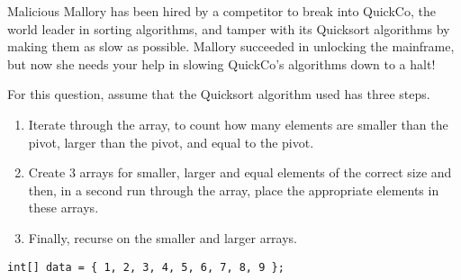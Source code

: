 \begin{blocksection}
Malicious Mallory has been hired by a competitor to break into QuickCo, the
world leader in sorting algorithms, and tamper with its Quicksort algorithms by
making them as slow as possible. Mallory succeeded in unlocking the mainframe,
but now she needs your help in slowing QuickCo's algorithms down to a halt!

For this question, assume that the Quicksort algorithm used has three steps.

\begin{enumerate}
\item Iterate through the array, to count how many elements are smaller than
the pivot, larger than the pivot, and equal to the pivot.
\item Create 3 arrays for smaller, larger and equal elements of the correct
size and then, in a second run through the array, place the appropriate
elements in these arrays.
\item Finally, recurse on the smaller and larger arrays.
\end{enumerate}

\vspace{\parskip}

\begin{lstlisting}
int[] data = { 1, 2, 3, 4, 5, 6, 7, 8, 9 };
\end{lstlisting}
\end{blocksection}
